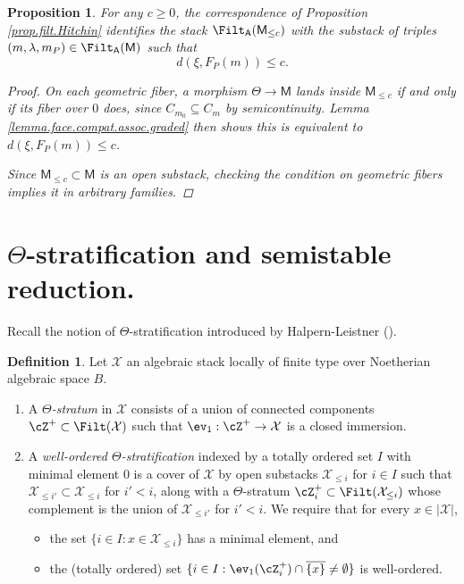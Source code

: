 \documentclass[openany]{amsbook}
\newtheorem{proposition}[theorem]{Proposition}
\theoremstyle{definition}
\newtheorem{definition}[theorem]{Definition}
\theoremstyle{remark}
\numberwithin{equation}{section}
\newcommand{\cX}{\mathcal{X}}
\newcommand{\ol}[1]{\overline{#1}}
\renewcommand{\-}{\operatorname{-}}
\newcommand{\bM}{\mathsf{M}}
\newcommand{\bA}{\mathsf{A}}
\begin{document}
\begin{proposition}\label{prop.filt.Hitchin.bdd}
    For any $c \ge 0$, the correspondence of Proposition \ref{prop.filt.Hitchin} identifies the stack $\Filt_{\bA}(\bM_{\le c})$ with the substack of triples $(m, \lambda, m_P) \in \Filt_{\bA}(\bM)$ such that 
    $$
        d(\xi, F_P(m)) \le c.
    $$
    \begin{proof}
        On each geometric fiber, a morphism $\Theta \to \bM$ lands inside $\bM_{\le c}$ if and only if its fiber over $0$ does, since $C_{m_0} \subseteq C_m$ by semicontinuity. Lemma \ref{lemma.face.compat.assoc.graded} then shows this is equivalent to $d(\xi, F_P(m)) \le c$.

        Since $\bM_{\le c} \subset \bM$ is an open substack, checking the condition on geometric fibers implies it in arbitrary families.
    \end{proof}
\end{proposition}






\section{\texorpdfstring{$\Theta$-stratification and semistable reduction.}{Theta-stratification and semistable reduction.}}


Recall the notion of $\Theta$-stratification introduced by Halpern-Leistner (\cite[Definition 2.1.1, Definition 2.1.2]{HalpernLeistnerInstability}).
\begin{definition}\label{def.theta.stratification}
    Let $\cX$ an algebraic stack locally of finite type over Noetherian algebraic space $B$.
    \begin{enumerate}
        \item A \emph{$\Theta$-stratum} in $\cX$ consists of a union of connected components $\cZ^+ \subset \Filt(\cX)$ such that $\ev_1: \cZ^+ \to \cX$ is a closed immersion.
        \item A \emph{well-ordered $\Theta$-stratification} indexed by a totally ordered set $I$ with minimal element $0$ is a cover of $\cX$ by open substacks $\cX_{\le i}$ for $i \in I$ such that $\cX_{\le i'} \subset \cX_{\le i}$ for $i' < i$, along with a $\Theta$-stratum $\cZ_i^+ \subset \Filt(\cX_{\le i})$ whose complement is the union of $\cX_{\le i'}$ for $i' < i$. We require that for every $x \in |\cX|$,
        \begin{itemize}
            \item the set $\{i \in I : x \in \cX_{\le i}\}$ has a minimal element, and
            \item the (totally ordered) set $\{i \in I : \ev_1(\cZ_{i}^+) \cap \ol{\{ x\}} \neq \emptyset \}$ is well-ordered.
        \end{itemize}
    \end{enumerate}
\end{definition}
\end{document}
